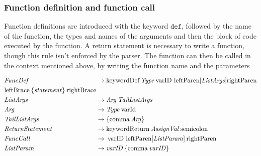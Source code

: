 \subsubsection*{Function definition and function call}

Function definitions are introduced with the keyword $\texttt{def}$, followed by the name of the function, the types and names of the arguments and then the block of code executed by the function.
A return statement is necessary to write a function, though this rule isn't enforced by the parser.
The function can then be called in the context mentioned above, by writing the function name and the parameters

\begin{align*}
    \omit $\mathit{FuncDef}$ \hfil &\rightarrow \text{keywordDef} \: \mathit{Type} \: \text{varID leftParen} [\mathit{ListArgs}] \text{rightParen} \\
    \hfil \text{leftBrace} \: \{ \mathit{statement} \} \: \text{rightBrace} \\
    \omit $\mathit{ListArgs}$ \hfil &\rightarrow \mathit{Arg} \:  \mathit{TailListArgs} \\
    \omit $\mathit{Arg}$ \hfil &\rightarrow \mathit{Type} \: \text{varId} \\
    \omit $\mathit{TailListArgs}$ \hfil & \rightarrow \{ \text{comma} \: \mathit{Arg} \} \\
    \omit $\mathit{ReturnStatement}$ \hfil &\rightarrow \text{keywordReturn} \: \mathit{AssignVal} \: \text{semicolon} \\
    \omit $\mathit{FuncCall}$ \hfil &\rightarrow \: \text{varID leftParen} [\mathit{ListParam}] \: \text{rightParen} \\
    \omit $\mathit{ListParam}$ \hfil &\rightarrow \mathit{varID} \:  \{ \text{comma} \: \mathit{varID} \} \\
\end{align*}
